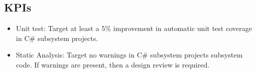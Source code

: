 \subsection{KPIs}
\begin{itemize}
    \item Unit test: Target at least a 5\% improvement in automatic unit test
      coverage in C\# subsystem projects.
    \item Static Analysis: Target no warnings in C\# subsystem projects
      subsystem code. If warnings are present, then a design review is required.
\end{itemize}

